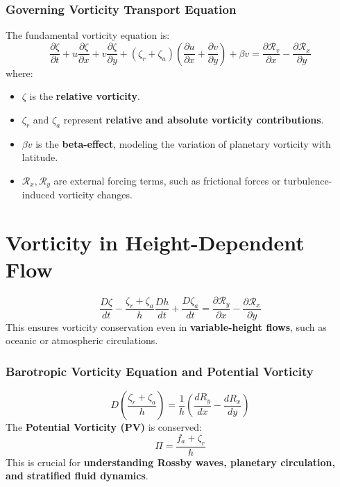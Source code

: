 \documentclass[a4paper,10pt]{article}
\begin{document}
    \subsubsection*{Governing Vorticity Transport Equation}
    The fundamental vorticity equation is:
    \begin{equation*}
        \frac{\partial \zeta}{\partial t} + u \frac{\partial \zeta}{\partial x} + v \frac{\partial \zeta}{\partial y} + \left( \zeta_r + \zeta_a \right) \left( \frac{\partial u}{\partial x} + \frac{\partial v}{\partial y} \right) + \beta v = \frac{\partial \mathcal{R}_v}{\partial x} - \frac{\partial \mathcal{R}_x}{\partial y}
    \end{equation*}
    where:
    \begin{itemize}
        \item $\zeta$ is the \textbf{relative vorticity}.
        \item $\zeta_r$ and $\zeta_a$ represent \textbf{relative and absolute vorticity contributions}.
        \item $\beta v$ is the \textbf{beta-effect}, modeling the variation of planetary vorticity with latitude.
        \item $\mathcal{R}_x, \mathcal{R}_y$ are external forcing terms, such as frictional forces or turbulence-induced vorticity changes.
    \end{itemize}

    \section*{Vorticity in Height-Dependent Flow}
    \begin{equation*}
        \frac{D \zeta}{d t} - \frac{ \zeta_r + \zeta_a }{h}  \frac{D h}{d t} + \frac{D \zeta_a}{d t}  = \frac{\partial \mathcal{R}_y}{\partial x} - \frac{\partial \mathcal{R}_x}{\partial y}
    \end{equation*}
    This ensures vorticity conservation even in \textbf{variable-height flows}, such as oceanic or atmospheric circulations.

    \subsubsection*{Barotropic Vorticity Equation and Potential Vorticity}
    \begin{equation*}
        D\left(\frac{\zeta_r+\zeta_a}{h}\right)=\frac{1}{h}\left(\frac{d R_y}{d x}-\frac{d R_x}{d y}\right)
    \end{equation*}
    The \textbf{Potential Vorticity (PV)} is conserved:
    \begin{equation*}
        \Pi = \frac{f_a+\zeta_r}{h}
    \end{equation*}
    This is crucial for \textbf{understanding Rossby waves, planetary circulation, and stratified fluid dynamics}.
\end{document}
